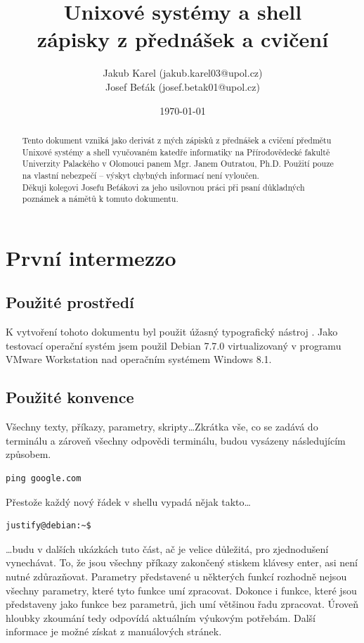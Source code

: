 \documentclass{article}
\title{\Huge{Unixové systémy a shell}\\ \vspace{1em} \normalsize{zápisky z přednášek a cvičení}}
\author{
	\normalsize Jakub Karel (jakub.karel03@upol.cz) \\
	\normalsize Josef Beťák (josef.betak01@upol.cz)}
\date{\today}
\begin{document}
\maketitle

\begin{abstract}
Tento dokument vzniká jako derivát z mých zápisků z přednášek a cvičení předmětu Unixové systémy a shell vyučovaném katedře informatiky na Přírodovědecké fakultě Univerzity Palackého v Olomouci panem Mgr. Janem Outratou, Ph.D. Použití pouze na vlastní nebezpečí -- výskyt chybných informací není vyloučen.\\
Děkuji kolegovi Josefu Beťákovi za jeho usilovnou práci při psaní důkladných poznámek a námětů k tomuto dokumentu.
\end{abstract}

\thispagestyle{empty}
\newpage
\thispagestyle{empty}
\tableofcontents
\thispagestyle{empty}
\newpage

\setcounter{page}{1}
\section{První intermezzo}
\subsection{Použité prostředí}
K vytvoření tohoto dokumentu byl použit úžasný typografický nástroj \LaTeXe. Jako testovací operační systém jsem použil Debian 7.7.0 virtualizovaný v programu VMware Workstation nad operačním systémem Windows 8.1.

\subsection{Použité konvence}
Všechny texty, příkazy, parametry, skripty\dots Zkrátka vše, co se zadává do terminálu a zároveň všechny odpovědi terminálu, budou vysázeny následujícím způsobem. 
\begin{verbatim}
ping google.com
\end{verbatim}
Přestože každý nový řádek v shellu vypadá nějak takto\dots
\begin{verbatim}
justify@debian:~$ 
\end{verbatim}
\dots budu v dalších ukázkách tuto část, ač je velice důležitá, pro zjednodušení vynechávat. To, že jsou všechny příkazy zakončený stiskem klávesy enter, asi není nutné zdůrazňovat. Parametry představené u některých funkcí rozhodně nejsou všechny parametry, které tyto funkce umí zpracovat. Dokonce i funkce, které jsou představeny jako funkce bez parametrů, jich umí většinou řadu zpracovat. Úroveň hloubky zkoumání tedy odpovídá aktuálním výukovým potřebám. Další informace je možné získat z manuálových stránek.
\end{document}
